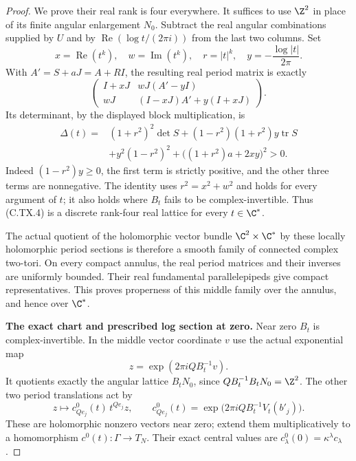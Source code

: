 \begin{proof}
We prove their real rank is four everywhere.
It suffices to use $\Z^2$ in place of its finite
angular enlargement $N_0$. Subtract the real
angular combinations supplied by $U$ and by
$\operatorname{Re}(\log t/(2\pi i))$ from the
last two columns. Set
\[
 x=\operatorname{Re}(t^k),\quad
 w=\operatorname{Im}(t^k),\quad
 r=|t|^k,\quad
 y=-\frac{\log|t|}{2\pi}.
\tag{C.TX.5}
\]
With $A'=S+aJ=A+RI$, the resulting real
period matrix is exactly
\[
 \begin{pmatrix}
 I+xJ & wJ(A'-yI)\\
 wJ   & (I-xJ)A'+y(I+xJ)
 \end{pmatrix}.
\tag{C.TX.6}
\]
Its determinant, by the displayed block
multiplication, is
\[
 \begin{aligned}
 \Delta(t)={}&(1+r^2)^2\det S
       +(1-r^2)(1+r^2)y\operatorname{tr}S\\
       &+y^2(1-r^2)^2
       +\bigl((1+r^2)a+2xy\bigr)^2>0.
 \end{aligned}
\tag{C.TX.7}
\]
Indeed $(1-r^2)y\ge0$, the first term is
strictly positive, and the other three
terms are nonnegative. The identity uses
$r^2=x^2+w^2$ and holds for every argument
of $t$; it also holds where $B_t$ fails
to be complex-invertible. Thus (C.TX.4)
is a discrete rank-four real lattice
for every $t\in\C^*$.

The actual quotient of the holomorphic
vector bundle $\C^2\times\C^*$ by these
locally holomorphic period sections is
therefore a smooth family of connected
complex two-tori. On every compact
annulus, the real period matrices and
their inverses are uniformly bounded.
Their real fundamental parallelepipeds
give compact representatives. This
proves properness of this middle family
over the annulus, and hence over $\C^*$.

\par\medskip\noindent\textbf{The exact chart and prescribed log section at zero.}
Near zero $B_t$ is complex-invertible.
In the middle vector coordinate $v$ use
the actual exponential map
\[
                   z=\exp(2\pi iQ B_t^{-1}v).
\tag{C.TX.8}
\]
It quotients exactly the angular lattice
$B_tN_0$, since $QB_t^{-1}B_tN_0=\Z^2$.
The other two period translations act by
\[
 z\longmapsto c^0_{Qe_j}(t)\,t^{Qe_j}z,
 \qquad
 c^0_{Qe_j}(t)=
       \exp\bigl(2\pi iQ B_t^{-1}V_t(b'_j)\bigr).
\tag{C.TX.9}
\]
These are holomorphic nonzero vectors
near zero; extend them multiplicatively
to a homomorphism $c^0(t):\Gamma\to T_N$.
Their exact central values are
$c^0_\lambda(0)=\kappa^\lambda c_\lambda$.


\end{proof}
